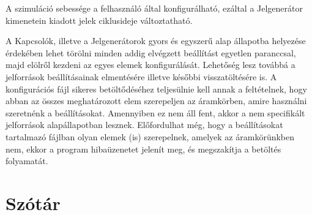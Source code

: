 A szimuláció sebessége a felhasználó által konfigurálható, ezáltal a Jelgenerátor kimenetein kiadott jelek ciklusideje változtatható.

A Kapcsolók, illetve a Jelgenerátorok gyors és egyszerű alap állapotba helyezése érdekében lehet törölni minden addig elvégzett beállítást egyetlen paranccsal, majd elölről kezdeni az egyes elemek konfigurálását. Lehetőség lesz továbbá a jelforrások beállításainak elmentésére illetve későbbi visszatöltésére is. A konfigurációs fájl sikeres betöltődéséhez teljesülnie kell annak a feltételnek, hogy abban az összes meghatározott elem szerepeljen az áramkörben, amire használni szeretnénk a beállításokat. Amennyiben ez nem áll fent, akkor a nem specifikált jelforrások alapállapotban lesznek. Előfordulhat még, hogy a beállításokat tartalmazó fájlban olyan elemek (is) szerepelnek, amelyek az áramkörünkben nem, ekkor a program hibaüzenetet jelenít meg, és megszakítja a betöltés folyamatát.

\section{Szótár}

